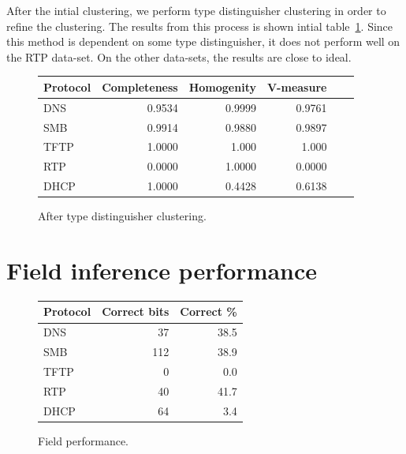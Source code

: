 \documentclass[a4paper]{report}
\begin{document}
After the intial clustering, we perform type distinguisher clustering in order
to refine the clustering. The results from this process is shown intial
table~\ref{table:tdclusterresults}. Since this method is dependent on some
type distinguisher, it does not perform well on the RTP data-set. On the
other data-sets, the results are close to ideal.

\begin{figure}[h]
    \centering
    \begin{tabular}{| l | r | r | r | r | r |}
        \hline
        \textbf{Protocol}&\textbf{Completeness}&\textbf{Homogenity}&\textbf{V-measure} \\ \hline
        DNS & 0.9534 & 0.9999 & 0.9761 \\ \hline
        SMB & 0.9914 & 0.9880 & 0.9897 \\ \hline
        TFTP & 1.0000 & 1.000 & 1.000 \\ \hline
        RTP & 0.0000 & 1.0000 & 0.0000 \\ \hline
        DHCP & 1.0000 & 0.4428 & 0.6138 \\ \hline
    \end{tabular}
    \caption{After type distinguisher clustering.}
    \label{table:tdclusterresults}
\end{figure}

\section{Field inference performance}
%

\begin{figure}
    \centering
    \begin{tabular}{| l | r | r |}
        \hline
        \textbf{Protocol}&\textbf{Correct bits}&\textbf{Correct \%} \\ \hline
        DNS & 37 & 38.5 \\ \hline
        SMB & 112 & 38.9 \\ \hline
        TFTP & 0 & 0.0 \\ \hline
        RTP & 40 & 41.7 \\ \hline
        DHCP & 64 & 3.4 \\ \hline
    \end{tabular}
    \caption{Field performance.}
\end{figure}
\end{document}
